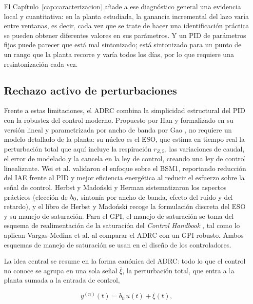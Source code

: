 El Capítulo~\ref{cap:caracterizacion} añade a ese diagnóstico general una
evidencia local y cuantitativa: en la planta estudiada, la ganancia incremental
del lazo varía entre ventanas, es decir, cada vez que se trate de hacer una identificación
práctica se pueden obtener diferentes valores en sus parámetros. Y un PID de
parámetros fijos puede parecer que está mal sintonizado; está sintonizado para un punto de un
rango que la planta recorre y varía todos los días, por lo que requiere una resintonización cada vez.



\subsection{Rechazo activo de perturbaciones}

Frente a estas limitaciones, el ADRC combina la simplicidad estructural del
PID con la robustez del control moderno. Propuesto por Han \cite{han2009adrc} y
formalizado en su versión lineal y parametrizada por ancho de banda por Gao
\cite{gao2003scaling,gao2014centrality}, no requiere un modelo detallado de la
planta: su núcleo es el ESO, que estima en tiempo real la perturbación total
que aquí incluye la respiración $r_{Z,5}$, las variaciones de caudal, el
error de modelado y la cancela en la ley de control, creando una ley de control linealizante. Wei et al.
\cite{wei2020disturbance,Wei2020b} validaron el enfoque sobre el BSM1,
reportando reducción del IAE frente al PID y mejor eficiencia energética al reducir el esfuerzo sobre la señal de control. Herbst \cite{herbst2013practical} y Madoński y Herman
\cite{madonski2015survey} sistematizaron los aspectos prácticos (elección de
$b_{0}$, sintonía por ancho de banda, efecto del ruido y del retardo), y el
libro de Herbst y Madoński \cite{herbst2024adrc} recoge la formulación discreta
del ESO y su manejo de saturación. Para el GPI, el manejo de saturación se
toma del esquema de realimentación de la saturación del \emph{Control
Handbook} \cite{levine2011handbook}, tal como lo aplican Vargas-Medina et al.
\cite{vargas2026microgrids} al comparar el ADRC con un GPI robusto. Ambos
esquemas de manejo de saturación se usan en el diseño de los controladores.

La idea central se resume en la forma canónica del ADRC: todo lo que el
control no conoce se agrupa en una sola señal $\bar{\xi}$, la perturbación total, que
entra a la planta sumada a la entrada de control,

\begin{equation}
    y^{(n)}(t) = b_0\, u(t) + \bar{\xi}(t) ,
    \label{eq:intro_canonica}
\end{equation}

